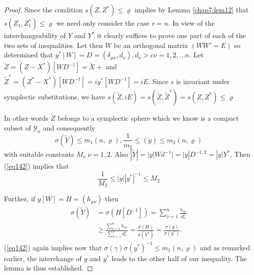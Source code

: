 \begin{proof}
Since the condition $s(Z ,Z^*) \le \varrho$ implies by Lemma
\ref{chap7:lem12} that $s(Z_1 , Z^*_1) \le \varrho$ we need only consider
the case $r = n $. In view of the interchangeability of $Y$ and $Y^*$
it clearly suffices to prove one part of each of the two sets of
inequalities. Let then $W$ be an orthogonal matrix $(W W' = E)$ so
determined that $y^* [W] = D = (\delta_{\mu \nu}, d_\nu), d_\nu > c \nu
= 1,2, \ldots n$. Let $\tilde{Z} = (Z - X^*) [W D^{-1}] = \tilde{X} +
$ and $\tilde{Z}^* = (Z^* - X^*) [W D^{-1}] = i y^* [WD^{-1}] =
iE$. Since $s$ is invariant under symplectic substitutions,
we have $s(\tilde{Z} , iE) = s(\tilde{Z},
\tilde{Z}^*) = s(Z,Z^*) \le \varrho$ 

In other words $\tilde{Z}$ belongs to a symplectic sphere which we know
is a compact subset of $\mathscr{Y}_n$ and consequently 
\begin{equation*}
\sigma(\tilde{Y}) \le m_1 (n , \varrho), \frac{1}{m_2} \le (\tilde{y}) 
\le m_2 (n , \varrho) \tag{142}\label{eq142} 
\end{equation*}
with suitable constants $M_\nu \; \nu = 1 ,2$. Also $|\tilde{Y}| = |y| W 
d^{-1}| = |y| D^{-1,2} = |y| Y^*$. Then (\ref{eq142}) implies that  
$$
\frac{1}{M_2} \le |y| |y^*|^{-1} \le M_2  
$$

Further, if $y [W] = H= (h_{\mu \nu})$ then 
\begin{align*}
\sigma (\tilde{Y}) & = \sigma(H [D^{-1}]) = \sum^n_{\nu =1}
\frac{h_{\nu \nu}}{d^2_\nu} \\ 
& \ge \frac{\sum^n_{\nu = 1} h_{\nu \nu }}{\sum^n_{\nu =1} d^2_\nu} =
\frac{\sigma(H)}{\sigma(Y^*)} = \frac {\sigma (y)}{\sigma(y^*)}. 
\end{align*}\pageoriginale  
(\ref{eq142}) again implies now that $\sigma(\gamma) \sigma (y^*)^{-1} \le m_1
(n, \varrho)$ and as remarked earlier, the interchange of $y$ and
$y^*$ leads to the other half of our inequality. The lemma is thus
established. 
\end{proof}

